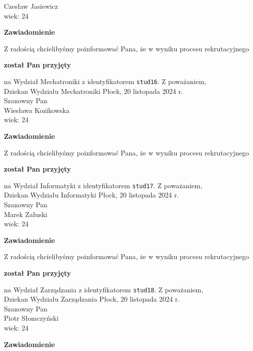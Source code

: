 \documentclass[12pt,a4paper]{article}
\begin{document}
Czesław Jasiewicz \\
wiek: 24
\bigskip
\begin{center}
 	{\Large\textbf{Zawiadomienie}}
\end{center}
\bigskip
Z radością chcielibyśmy poinformować Pana, że w wyniku procesu rekrutacyjnego 
\begin{center}
\textsf{\textbf{został Pan przyjęty}} 
\end{center}
na Wydział Mechatroniki z identyfikatorem \verb|stud16|. 
\vspace{2cm}
\noindent
Z poważaniem,\\
Dziekan
Wydziału Mechatroniki
\newpage
\hfill Płock, 20 listopada 2024 r.\\
\noindent 
Szanowny Pan \\
Wiesława Kozikowska \\
wiek: 24
\bigskip
\begin{center}
 	{\Large\textbf{Zawiadomienie}}
\end{center}
\bigskip
Z radością chcielibyśmy poinformować Pana, że w wyniku procesu rekrutacyjnego 
\begin{center}
\textsf{\textbf{został Pan przyjęty}} 
\end{center}
na Wydział Informatyki z identyfikatorem \verb|stud17|. 
\vspace{2cm}
\noindent
Z poważaniem,\\
Dziekan
Wydziału Informatyki
\newpage
\hfill Płock, 20 listopada 2024 r.\\
\noindent 
Szanowny Pan \\
Marek Załuski \\
wiek: 24
\bigskip
\begin{center}
 	{\Large\textbf{Zawiadomienie}}
\end{center}
\bigskip
Z radością chcielibyśmy poinformować Pana, że w wyniku procesu rekrutacyjnego 
\begin{center}
\textsf{\textbf{został Pan przyjęty}} 
\end{center}
na Wydział Zarządzania z identyfikatorem \verb|stud18|. 
\vspace{2cm}
\noindent
Z poważaniem,\\
Dziekan
Wydziału Zarządzania
\newpage
\hfill Płock, 20 listopada 2024 r.\\
\noindent 
Szanowny Pan \\
Piotr Słomczyński \\
wiek: 24
\bigskip
\begin{center}
 	{\Large\textbf{Zawiadomienie}}
\end{center}
\end{document}
